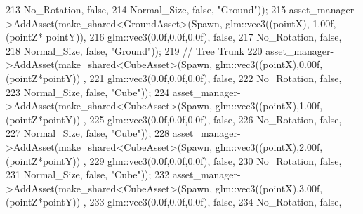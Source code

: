 \begin{DoxyCode}
213                                                              No\_Rotation, \textcolor{keyword}{false},
214                                                              Normal\_Size, \textcolor{keyword}{false}, \textcolor{stringliteral}{"Ground"}));
215             asset\_manager->AddAsset(make\_shared<GroundAsset>(Spawn, glm::vec3((pointX),-1.00f,(pointZ*
      pointY)),
216                                                              glm::vec3(0.0f,0.0f,0.0f), \textcolor{keyword}{false},
217                                                              No\_Rotation, \textcolor{keyword}{false},
218                                                              Normal\_Size, \textcolor{keyword}{false}, \textcolor{stringliteral}{"Ground"}));
219             \textcolor{comment}{// Tree Trunk}
220             asset\_manager->AddAsset(make\_shared<CubeAsset>(Spawn, glm::vec3((pointX),0.00f,(pointZ*pointY))
      , 
221                                                            glm::vec3(0.0f,0.0f,0.0f), \textcolor{keyword}{false},
222                                                            No\_Rotation, \textcolor{keyword}{false},
223                                                            Normal\_Size, \textcolor{keyword}{false}, \textcolor{stringliteral}{"Cube"}));
224             asset\_manager->AddAsset(make\_shared<CubeAsset>(Spawn, glm::vec3((pointX),1.00f,(pointZ*pointY))
      , 
225                                                            glm::vec3(0.0f,0.0f,0.0f), \textcolor{keyword}{false},
226                                                            No\_Rotation, \textcolor{keyword}{false},
227                                                            Normal\_Size, \textcolor{keyword}{false}, \textcolor{stringliteral}{"Cube"}));        
228             asset\_manager->AddAsset(make\_shared<CubeAsset>(Spawn, glm::vec3((pointX),2.00f,(pointZ*pointY))
      , 
229                                                            glm::vec3(0.0f,0.0f,0.0f), \textcolor{keyword}{false},
230                                                            No\_Rotation, \textcolor{keyword}{false},
231                                                            Normal\_Size, \textcolor{keyword}{false}, \textcolor{stringliteral}{"Cube"}));
232             asset\_manager->AddAsset(make\_shared<CubeAsset>(Spawn, glm::vec3((pointX),3.00f,(pointZ*pointY))
      , 
233                                                            glm::vec3(0.0f,0.0f,0.0f), \textcolor{keyword}{false},
234                                                            No\_Rotation, \textcolor{keyword}{false},

\end{DoxyCode}
